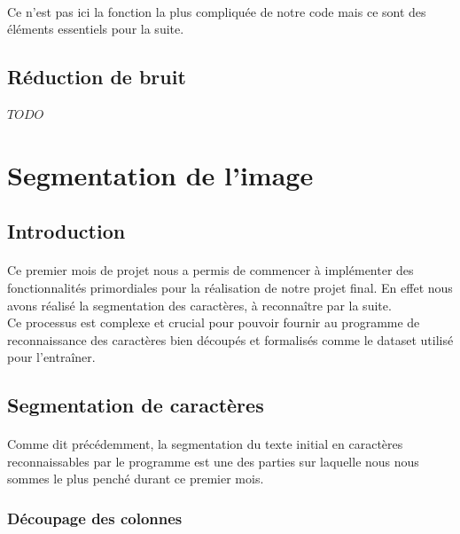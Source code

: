 \documentclass{article}
\begin{document}
\paragraph{} Ce n'est pas ici la fonction la plus compliquée de notre code mais ce sont des éléments essentiels pour la suite.


\subsection{Réduction de bruit}

$ TODO $



\newpage
{}
\section{Segmentation de l'image}
\subsection{Introduction}
    \paragraph{}
    Ce premier mois de projet nous a permis de commencer à implémenter des fonctionnalités primordiales pour la réalisation de notre projet final. En effet nous avons réalisé la segmentation des caractères, à reconnaître par la suite. \\
    Ce processus est complexe et crucial pour pouvoir fournir au programme de reconnaissance des caractères bien découpés et formalisés comme le dataset utilisé pour l'entraîner.
    
\subsection{Segmentation de caractères}
    \paragraph{}
    Comme dit précédemment, la segmentation du texte initial en caractères reconnaissables par le programme est une des parties sur laquelle nous nous sommes le plus penché durant ce premier mois.
    
    \subsubsection{Découpage des colonnes}
\end{document}
